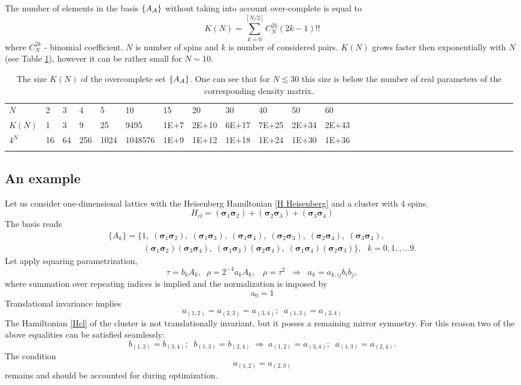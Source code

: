 \documentclass[a4paper]{jpconf}
\renewcommand\[{\begin{equation}}
\renewcommand\]{\end{equation}}
\newcommand{\ssigma}{{\bm \sigma}}
\newcommand{\A}{{\cal A}}
\begin{document}
The number of elements in the basis $\{A_\A\}$ without taking into account over-complete is equal to
\[K(N)=\sum_{k=0}^{[N/2]}C_N^{2k}(2k-1)!!\]
where $C_N^{2k}$ - binomial coefficient, $N$ is number of spins and $k$ is number of considered pairs.
$K(N)$ grows faster then exponentially with $N$ (see Table \ref{KN}), however it can be rather small for $N\sim 10$.

\begin{table}
	\caption{\label{KN}The size $K(N)$ of the overcomplete set $\{A_\A\}$. One can see that for $N\lesssim 30$ this size is below the number of real parameters of the corresponding density matrix. }
	\begin{center}
		\begin{tabular}{lllllllllllllllllllllllllllllll}
			\br
			$N$&2 &3 &4 &5 &10 &15 &20 &30 &40 &50 &60 \\
			\mr
			$K(N)$&1 &3 &9 &25 &9495 &1E+7 &2E+10 &6E+17 &7E+25 &2E+34 &2E+43 \\
			$4^N$&16&64&256&1024&1048576&1E+9&1E+12&1E+18&1E+24&1E+30&1E+36\\
			\br
		\end{tabular}
	\end{center}
\end{table}

\subsection{An example}
Let us consider one-dimensional lattice with the Heisenberg Hamiltonian \eqref{H Heisenberg} and a cluster with 4 spins.
\[{H_{cl}} = ({{\ssigma}_1}{{\ssigma}_2}) + ({{\ssigma}_2}{{\ssigma}_3}) + ({{\ssigma}_3}{{\ssigma}_4})\label{Hcl}\]
The basis reads 
\[\begin{array}{l}
\{ {A_k}\}  = \{ 1,\;({{\ssigma}_1}{{\ssigma}_2}),\;({{\ssigma}_1}{{\ssigma}_3}),\;({{\ssigma}_1}{{\ssigma}_4}),\;({{\ssigma}_2}{{\ssigma}_3}),\;({{\ssigma}_2}{{\ssigma}_4}),\;({{\ssigma}_3}{{\ssigma}_4}),\;\\
\;\;\;\;\;\;\;\;\;\;\;\;\;\;\;({{\ssigma}_1}{{\ssigma}_2})({{\ssigma}_3}{{\ssigma}_4}),\;
({{\ssigma}_1}{{\ssigma}_3})({{\ssigma}_2}{{\ssigma}_4}),\;({{\ssigma}_1}{{\ssigma}_4})({{\ssigma}_2}{{\ssigma}_3})\}, ~~~k=0,1,,...9.
\end{array}\]
Let apply squaring parametrization,
\[\tau  = {b_k}{A_k},\;\;\rho  = 2^{-4}{a_k}{A_k},\;\;\;\rho  = {\tau ^2}\;\; \Rightarrow \;\;{a_k} = {a_{k,ij}}{b_i}{b_j},\]
where summation over repeating indices is implied and the normalization is imposed by 
\[{a_0} = 1\]
Translational invariance implies 
\[{a_{(1,2)}} = {a_{(2,3)}} = {a_{(3,4)}};\;\;{a_{(1,3)}} = {a_{(2,4)}}\]
The Hamiltonian \eqref{Hcl} of the cluster  is not translationally invariant, but it posses a remaining mirror symmetry. For this reason two of the above equalities can be satisfied seamlessly:  
\[
{b_{(1,2)}} = {b_{(3,4)}};\;\;{b_{(1,3)}} = {b_{(2,4)}}\;\Rightarrow\;
{a_{(1,2)}} = {a_{(3,4)}};\;\;{a_{(1,3)}} = {a_{(2,4)}}.
\]
The condition 
\[a_{(1,2)}=a_{(2,3)}\]
remains and should be accounted for during optimization. 
\end{document}
